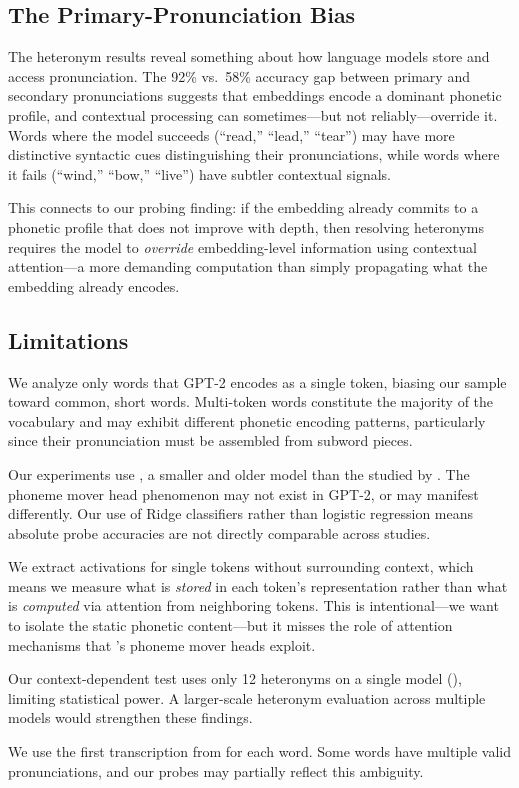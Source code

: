 \subsection{The Primary-Pronunciation Bias}

The heteronym results reveal something about how language models store and access pronunciation.
The 92\% vs.\ 58\% accuracy gap between primary and secondary pronunciations suggests that embeddings encode a dominant phonetic profile, and contextual processing can sometimes---but not reliably---override it.
Words where the model succeeds (``read,'' ``lead,'' ``tear'') may have more distinctive syntactic cues distinguishing their pronunciations, while words where it fails (``wind,'' ``bow,'' ``live'') have subtler contextual signals.

This connects to our probing finding: if the embedding already commits to a phonetic profile that does not improve with depth, then resolving heteronyms requires the model to \emph{override} embedding-level information using contextual attention---a more demanding computation than simply propagating what the embedding already encodes.

\subsection{Limitations}

We analyze only words that GPT-2 encodes as a single token, biasing our sample toward common, short words.
Multi-token words constitute the majority of the vocabulary and may exhibit different phonetic encoding patterns, particularly since their pronunciation must be assembled from subword pieces.

Our experiments use \gptmed, a smaller and older model than the \llama studied by \citet{mclaughlin2025rhyme}.
The phoneme mover head phenomenon may not exist in GPT-2, or may manifest differently.
Our use of Ridge classifiers rather than logistic regression means absolute probe accuracies are not directly comparable across studies.

We extract activations for single tokens without surrounding context, which means we measure what is \emph{stored} in each token's representation rather than what is \emph{computed} via attention from neighboring tokens.
This is intentional---we want to isolate the static phonetic content---but it misses the role of attention mechanisms that \citet{mclaughlin2025rhyme}'s phoneme mover heads exploit.

Our context-dependent test uses only 12 heteronyms on a single model (\gptfour), limiting statistical power.
A larger-scale heteronym evaluation across multiple models would strengthen these findings.

We use the first transcription from \wikipron for each word.
Some words have multiple valid pronunciations, and our probes may partially reflect this ambiguity.
